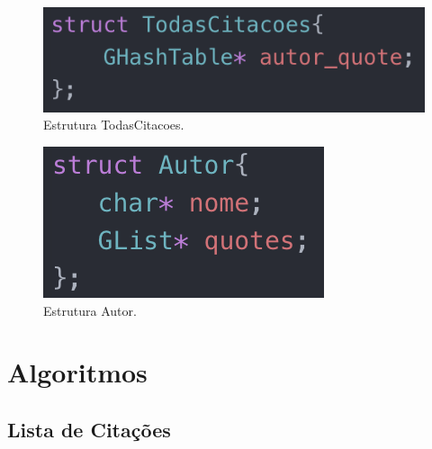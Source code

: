 \documentclass[11pt,a4paper]{report}
\begin{document}
\begin{figure}[H]
\centering
\includegraphics[scale=0.9]{TodasCitacoes.png}
\caption{Estrutura TodasCitacoes.}
\label{img:todas_citacoes}
\end{figure}

\begin{figure}[H]
\centering
\includegraphics[scale=0.9]{Autor.png}
\caption{Estrutura Autor.}
\label{img:autor}
\end{figure}


\section{Algoritmos}
\subsection{Lista de Citações}
\end{document}
